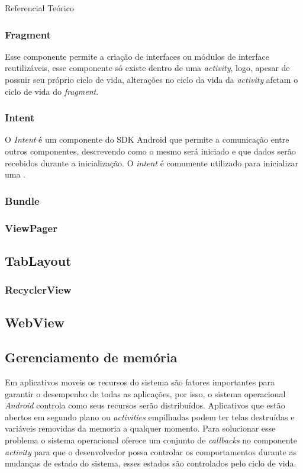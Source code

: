 \documentclass[
	12pt,				%
	openright,			%
	twoside,			%
	a4paper,			%
	english,			%
	french,				%
	spanish,			%
	brazil				%
	]{abntex2}
\begin{document}
\begin{chapter}{Referencial Teórico}
\subsubsection{Fragment} \label{fragment}
Esse componente permite a criação de interfaces ou módulos de interface reutilizáveis, esse componente só existe dentro de uma \textit{activity}, logo, apesar de possuir seu próprio ciclo de vida, alterações no ciclo da vida da \textit{activity} afetam o ciclo de vida do \textit{fragment}.  

\subsubsection{Intent} \label{Intent}
O \textit{Intent} é um componente do SDK Android que permite a comunicação entre outros componentes, descrevendo como o mesmo será iniciado e que dados serão recebidos durante a inicialização. O \textit{intent} é comumente utilizado para inicializar uma .

\subsubsection{Bundle} \label{Bundle}

\subsubsection{ViewPager} \label{ViewPager}

\subsection{TabLayout} \label{TabLayout}

\subsubsection{RecyclerView} \label{RecyclerView}

\subsection{WebView} \label{WebView}

\subsection{Gerenciamento de memória}
Em aplicativos moveis os recursos do sistema são fatores importantes para garantir o desempenho de todas as aplicações, por isso, o sistema operacional \textit{Android} controla como seus recursos serão distribuídos. Aplicativos que estão abertos em segundo plano ou \textit{activities} empilhadas podem ter telas destruídas e variáveis removidas da memoria a qualquer momento. Para solucionar esse problema o sistema operacional oferece um conjunto de \textit{callbacks} no componente \textit{activity} para que o desenvolvedor possa controlar os comportamentos durante as mudanças de estado do sistema, esses estados são controlados pelo ciclo de vida.


\end{chapter}
\end{document}
